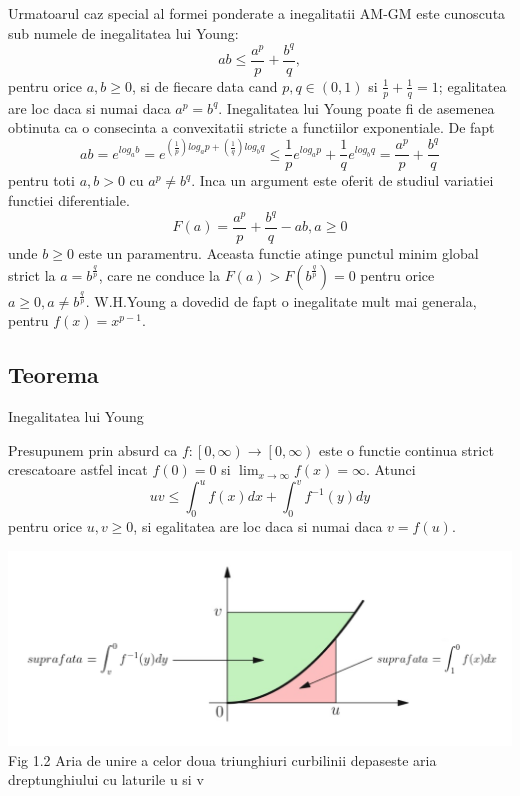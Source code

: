 \documentclass[a4paper,12pt,oneside]{report}
\begin{document}
Urmatoarul caz special al formei ponderate a inegalitatii AM-GM este cunoscuta sub numele de inegalitatea lui Young:  
\begin{displaymath}
  ab \leq \frac{a^{p}}{p}+ \frac{b^{q}}{q},
\end{displaymath} 
pentru orice \(a,b \geq 0\),
si de fiecare data cand  \(p,q \in \left ( 0 , 1 \right )\) si \(\frac{1}{p}+\frac{1}{q} = 1\); egalitatea are loc daca si numai daca \(a^{p}= b^{q}\). Inegalitatea lui Young poate fi de asemenea obtinuta ca o consecinta a convexitatii stricte a functiilor exponentiale. De fapt 
\begin{displaymath}
  ab = e^{log_{a}b}= e^{\left (\frac{1}{p}  \right )log_{a}p+ \left ( \frac{1}{q} \right )log_{b}q}
\leq \frac{1}{p}e^{log_{a}p}+\frac{1}{q}e^{log_{b}q}= \frac{a^{p}}{p}+\frac{b^{q}}{q}
\end{displaymath}
pentru toti \(a,b>0\) cu \(a^{p}\neq b^{q}\). Inca un argument este oferit de studiul variatiei functiei diferentiale. 
\begin{displaymath}
  F\left ( a \right )= \frac{a^{p}}{p}+\frac{b^{q}}{q} - ab, a\geq 0
\end{displaymath}
unde \(b\geq 0\) este un paramentru. Aceasta functie atinge punctul minim global strict la \(a= b^{\frac{q}{p}}\), care ne conduce la \(F\left ( a \right )> F\left ( b^{\frac{q}{p}} \right ) = 0\) pentru orice \(a\geq 0, a\neq b^{\frac{q}{p}}\). 
	W.H.Young a dovedid de fapt  o inegalitate mult mai generala, pentru \(f\left ( x \right )=  x^{p-1}\).

\subsection{Teorema}

Inegalitatea lui Young

Presupunem prin absurd ca \(f: \left [ 0,\infty  \right ) \rightarrow \left [ 0,\infty  \right )\) este o functie continua strict crescatoare astfel incat \(f\left ( 0 \right )= 0\) si \(\lim_{x\rightarrow \infty }f\left ( x \right )= \infty\). Atunci 
\begin{displaymath}
  uv\leq \int_{0}^{u}f\left ( x \right )dx + \int_{0}^{v}f^{-1}\left ( y \right )dy
\end{displaymath}
pentru orice \(u,v\geq 0\), si egalitatea are loc daca si numai daca \( v = f\left ( u \right )\). 

\begin{center}
	\includegraphics[width=1.0\textwidth]{fig1.2.png}
	\\ Fig 1.2 Aria  de unire a celor doua triunghiuri curbilinii depaseste aria dreptunghiului cu laturile u si v
\end{center}
\end{document}
